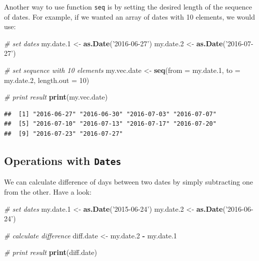 \documentclass[11pt,]{book}
\newenvironment{Shaded}{\begin{snugshade}}{\end{snugshade}}
\newcommand{\KeywordTok}[1]{\textcolor[rgb]{0.27,0.27,0.27}{\textbf{#1}}}
\newcommand{\DataTypeTok}[1]{\textcolor[rgb]{0.27,0.27,0.27}{#1}}
\newcommand{\DecValTok}[1]{\textcolor[rgb]{0.06,0.06,0.06}{#1}}
\newcommand{\StringTok}[1]{\textcolor[rgb]{0.5,0.5,0.5}{#1}}
\newcommand{\CommentTok}[1]{\textcolor[rgb]{0.56,0.35,0.01}{\textit{#1}}}
\newcommand{\OperatorTok}[1]{\textcolor[rgb]{0.81,0.36,0.00}{\textbf{#1}}}
\newcommand{\NormalTok}[1]{#1}
\begin{document}
Another way to use function \texttt{seq} is by setting the desired
length of the sequence of dates. For example, if we wanted an array of
dates with 10 elements, we would use:

\begin{Shaded}
\begin{Highlighting}[]
\CommentTok{# set dates}
\NormalTok{my.date.}\DecValTok{1}\NormalTok{ <-}\StringTok{ }\KeywordTok{as.Date}\NormalTok{(}\StringTok{'2016-06-27'}\NormalTok{)}
\NormalTok{my.date.}\DecValTok{2}\NormalTok{ <-}\StringTok{ }\KeywordTok{as.Date}\NormalTok{(}\StringTok{'2016-07-27'}\NormalTok{)}

\CommentTok{# set sequence with 10 elements}
\NormalTok{my.vec.date <-}\StringTok{ }\KeywordTok{seq}\NormalTok{(}\DataTypeTok{from =}\NormalTok{ my.date.}\DecValTok{1}\NormalTok{, }
                   \DataTypeTok{to =}\NormalTok{ my.date.}\DecValTok{2}\NormalTok{, }
                   \DataTypeTok{length.out =} \DecValTok{10}\NormalTok{)}

\CommentTok{# print result                 }
\KeywordTok{print}\NormalTok{(my.vec.date)}
\end{Highlighting}
\end{Shaded}

\begin{verbatim}
##  [1] "2016-06-27" "2016-06-30" "2016-07-03" "2016-07-07"
##  [5] "2016-07-10" "2016-07-13" "2016-07-17" "2016-07-20"
##  [9] "2016-07-23" "2016-07-27"
\end{verbatim}

\subsection{\texorpdfstring{Operations with
\texttt{Dates}}{Operations with Dates}}\label{operations-with-dates}

We can calculate difference of days between two dates by simply
subtracting one from the other. Have a look:

\begin{Shaded}
\begin{Highlighting}[]
\CommentTok{# set dates}
\NormalTok{my.date.}\DecValTok{1}\NormalTok{ <-}\StringTok{ }\KeywordTok{as.Date}\NormalTok{(}\StringTok{'2015-06-24'}\NormalTok{)}
\NormalTok{my.date.}\DecValTok{2}\NormalTok{ <-}\StringTok{ }\KeywordTok{as.Date}\NormalTok{(}\StringTok{'2016-06-24'}\NormalTok{)}

\CommentTok{# calculate difference}
\NormalTok{diff.date <-}\StringTok{ }\NormalTok{my.date.}\DecValTok{2} \OperatorTok{-}\StringTok{ }\NormalTok{my.date.}\DecValTok{1}

\CommentTok{# print result}
\KeywordTok{print}\NormalTok{(diff.date)}
\end{Highlighting}
\end{Shaded}
\end{document}

